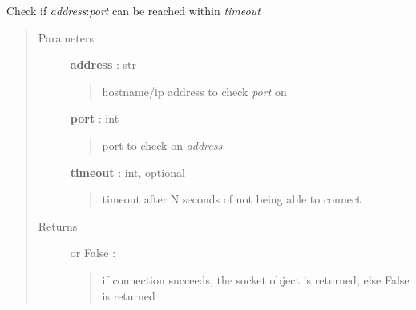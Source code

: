 \documentclass[letterpaper,10pt,english]{sphinxmanual}
\begin{document}
\begin{fulllineitems}
\label{pytan.utils:pytan.utils.port_check}
Check if \emph{address}:\emph{port} can be reached within \emph{timeout}
\begin{quote}\begin{description}
\item[{Parameters}] \leavevmode
\textbf{address} : str
\begin{quote}

hostname/ip address to check \emph{port} on
\end{quote}

\textbf{port} : int
\begin{quote}

port to check on \emph{address}
\end{quote}

\textbf{timeout} : int, optional
\begin{quote}

timeout after N seconds of not being able to connect
\end{quote}

\item[{Returns}] \leavevmode
\href{http://docs.python.org/2.7/library/socket.html\#module-socket}{} or False :
\begin{quote}

if connection succeeds, the socket object is returned, else False is returned
\end{quote}

\end{description}\end{quote}

\end{fulllineitems}

\end{document}
